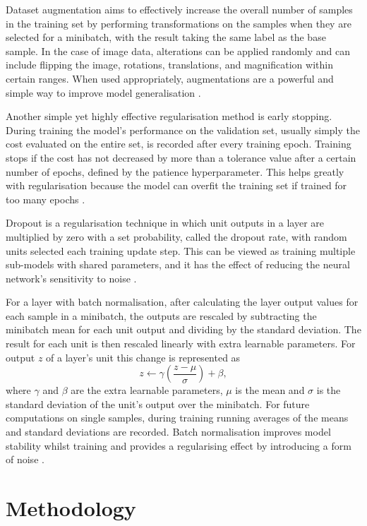 \documentclass[12pt]{article}
\begin{document}
Dataset augmentation aims to effectively increase the overall number of samples in the training set by performing transformations on the samples when they are selected for a minibatch, with the result taking the same label as the base sample. In the case of image data, alterations can be applied randomly and can include flipping the image, rotations, translations, and magnification within certain ranges. When used appropriately, augmentations are a powerful and simple way to improve model generalisation \cite{Goodfellow16}.

Another simple yet highly effective regularisation method is early stopping. During training the model's performance on the validation set, usually simply the cost evaluated on the entire set, is recorded after every training epoch. Training stops if the cost has not decreased by more than a tolerance value after a certain number of epochs, defined by the patience hyperparameter. This helps greatly with regularisation because the model can overfit the training set if trained for too many epochs \cite{Goodfellow16, Bishop95}.

Dropout is a regularisation technique in which unit outputs in a layer are multiplied by zero with a set probability, called the dropout rate, with random units selected each training update step. This can be viewed as training multiple sub-models with shared parameters, and it has the effect of reducing the neural network's sensitivity to noise \cite{Srivastava2014}.

For a layer with batch normalisation, after calculating the layer output values for each sample in a minibatch, the outputs are rescaled by subtracting the minibatch mean for each unit output and dividing by the standard deviation. The result for each unit is then rescaled linearly with extra learnable parameters. For output $z$ of a layer's unit this change is represented as
\begin{equation}
z\leftarrow\gamma\left(\frac{z-\mu}{\sigma}\right)+\beta, \label{batchnorm}
\end{equation}
where $\gamma$ and $\beta$ are the extra learnable parameters, $\mu$ is the mean and $\sigma$ is the standard deviation of the unit's output over the minibatch. For future computations on single samples, during training running averages of the means and standard deviations are recorded. Batch normalisation improves model stability whilst training and provides a regularising effect by introducing a form of noise \cite{Ioffe15}.

\section{Methodology}
\end{document}
